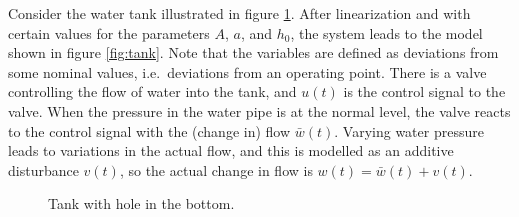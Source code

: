 \documentclass[letter,12pt]{scrartcl}
\begin{document}
Consider the water tank illustrated in figure \ref{fig:tank_ill}.  After linearization and with certain values for the parameters $A$, $a$, and $h_0$, the system leads to the model shown in figure \ref{fig:tank}. Note that the variables are defined as deviations from some nominal values, i.e.~deviations from an operating point. There is a valve controlling the flow of water into the tank, and $u(t)$ is the control signal to the valve. When the pressure in the water pipe is at the normal level, the valve reacts to the control signal with the (change in) flow $\bar{w}(t)$. Varying water pressure leads to variations in the actual flow, and this is modelled as an additive disturbance $v(t)$, so the actual change in flow is $w(t) = \bar{w}(t) + v(t)$. 
\begin{figure}[h]
  \begin{center}
    \caption{Tank with hole in the bottom.}
    \label{fig:tank_ill}
  \end{center}
\end{figure}
\end{document}
